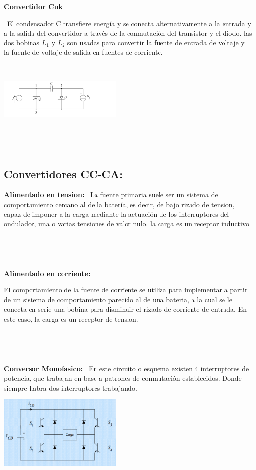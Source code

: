 \documentclass[12pt,letterpaper]{article}
\begin{document}
\textbf{Convertidor Cuk}
\

\
El condensador C transfiere energía y se conecta alternativamente a la entrada y a la salida del convertidor a través de la conmutación del transistor y el diodo.
las dos bobinas $L_1$ y $L_2$ son usadas para convertir la fuente de entrada de voltaje y la fuente de voltaje de salida en fuentes de corriente.
\

\







\includegraphics[width=6cm]{Convertidor Cuk.png} 

\

\
\subsection{Convertidores CC-CA:}

\textbf{Alimentado en tension:}
\
La fuente primaria suele ser un sistema de comportamiento cercano al de la batería, es decir, de bajo rizado de tension, capaz de imponer a la carga mediante la actuación de los interruptores del ondulador, una o varias tensiones de valor nulo. la carga es un receptor inductivo

\

\

\textbf{Alimentado en corriente:}

El comportamiento de la fuente de corriente se utiliza para implementar a partir de un sistema de comportamiento parecido al de una bateria, a la cual se le conecta en serie una bobina para disminuir el rizado de corriente de entrada. En este caso, la carga es un receptor de tension.


\

\

\textbf{Conversor Monofasico:}
\
En este circuito o esquema existen 4 interruptores de potencia, que trabajan en base a patrones de conmutación establecidos. Donde siempre habra dos interruptores trabajando.
\

\includegraphics[width=6cm]{Monofasico.png}
\end{document}
